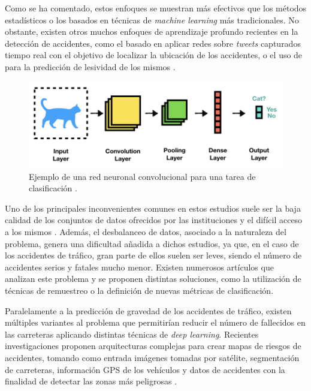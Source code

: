 Como se ha comentado, estos enfoques se muestran más efectivos que los métodos estadísticos o los basados en técnicas de \textit{machine learning} más tradicionales. No obstante, existen otros muchos enfoques de aprendizaje profundo recientes en la detección de accidentes, como el basado en aplicar redes  sobre \textit{tweets} capturados tiempo real \cite{DeteccionDeAccidentesPorTweets} con el objetivo de localizar la ubicación de los accidentes, o el uso de  para la predicción de lesividad de los mismos \cite{RNNAccidentSeverityPrediction}.


\begin{figure}[h]
    \centering
    \includegraphics[width=15cm]{archivos/2.EstadoArte/CNNExample}
    \caption{Ejemplo de una red neuronal convolucional para una tarea de clasificación \cite{CNNExampleEAImage}.}
    \label{CNNExample}
\end{figure}


Uno de los principales inconvenientes comunes en estos estudios suele ser la baja calidad de los conjuntos de datos ofrecidos por las instituciones y el difícil acceso a los mismos \cite{ImportanciaDeBajaCalidadActualmenteDeDatasets}. Además, el desbalanceo de datos, asociado a la naturaleza del problema, genera una dificultad añadida a dichos estudios, ya que, en el caso de los accidentes de tráfico, gran parte de ellos suelen ser leves, siendo el número de accidentes serios y fatales mucho menor. Existen numerosos artículos que analizan este problema y se proponen distintas soluciones, como la utilización de técnicas de remuestreo \cite{ItalianoMetricasDesbalanceo} o la definición de nuevas métricas de clasificación.


Paralelamente a la predicción de gravedad de los accidentes de tráfico, existen múltiples variantes al problema que permitirían reducir el número de fallecidos en las carreteras aplicando distintas técnicas de \textit{deep learning}. Recientes investigaciones proponen arquitecturas complejas para crear mapas de riesgos de accidentes, tomando como entrada imágenes tomadas por satélite, segmentación de carreteras, información GPS de los vehículos y datos de accidentes con la finalidad de detectar las zonas más peligrosas
\cite{MIT}.